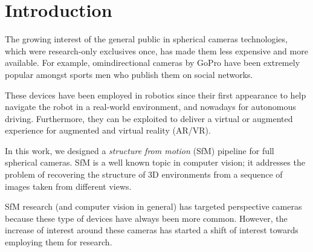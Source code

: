 \chapter{Introduction}
The growing interest of the general public in spherical cameras technologies, which were 
research-only exclusives once, has made them less expensive and more available. For example, omindirectional cameras by GoPro have been extremely popular amongst sports men who publish them on social networks.

These devices have been employed in robotics since their first appearance to help navigate the robot in a real-world environment, and nowadays for autonomous driving. Furthermore, they can be exploited to deliver a virtual or augmented experience for augmented and virtual reality (AR/VR).

In this work, we designed a \textit{structure from motion} (SfM) pipeline for 
full spherical cameras. SfM is a well known topic in computer vision; it addresses the problem of 
recovering the structure of 3D environments from a sequence of images taken from different views.

SfM research (and computer vision in general) has targeted perspective cameras because these type of devices have always been more common. However, the increase of interest around these cameras has started a shift of interest towards employing them for research.

